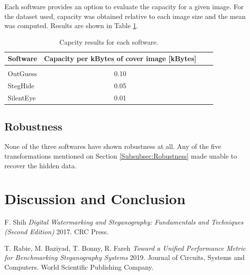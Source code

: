 \documentclass[11pt]{article}
\begin{document}
Each software provides an option to evaluate the capacity for a given image. For the dataset used, capacity was obtained
relative to each image size and the mean was computed. Results are shown in Table \ref{Tab:Capacity}.


\begin{table}[!h] 
\caption{Capcity results for each software.}
\label{Tab:Capacity}
\begin{tabular}{lclc}
\hline
\hline 
Software &  Capacity per kBytes of cover image [kBytes] \\
\hline
\midrule
{}       &   \\
OutGuess  &  0.10  \\
StegHide  &  0.05 \\
SilentEye   &  0.01 \\
\hline
\end{tabular}
\end{table}


\subsection{Robustness}

None of the three softwares have shown robustness at all. Any of the five transformations mentioned on Section 
\ref{Subsubsec:Robustness} made unable to recover the hidden data.

\section{Discussion and Conclusion}



  \begin{thebibliography}{1}

   F. Shih {\em Digital Watermarking and Steganography: Fundamentals and Techniques
(Second Edition)} 2017. CRC Press.					
  
   T. Rabie, M. Baziyad, T. Bonny, R. Fareh {\em Toward a Unified Performance Metric for Benchmarking
Steganography Systems} 2019. Journal of Circuits, Systems and Computers. World Scientific Publishing Company.

% 
% 

  \end{thebibliography}
\end{document}
